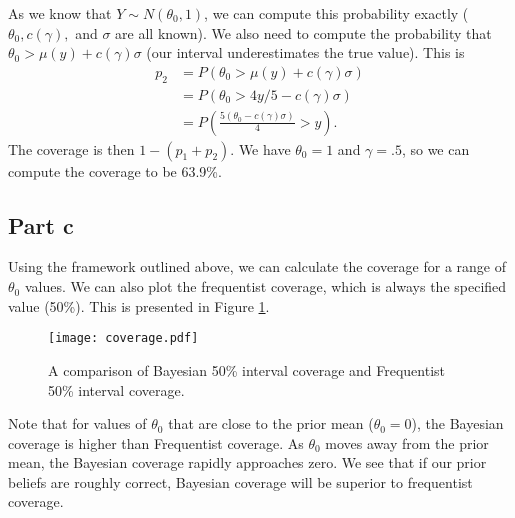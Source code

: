 \documentclass[a4paper,10pt]{article}
\begin{document}
As we know that $Y \sim N(\theta_{0},1)$, we can compute this probability exactly ($\theta_{0}, c(\gamma),$ and $\sigma$ are all known).  We also need to compute the probability that $\theta_{0} > \mu(y) + c(\gamma)\sigma$ (our interval underestimates the true value).  This is
\begin{align*}
p_{2} &= P(\theta_{0}>\mu(y)+c(\gamma)\sigma) \\
&= P(\theta_{0}>4y/5-c(\gamma)\sigma) \\
&= P\left(\frac{5(\theta_{0}-c(\gamma)\sigma)}{4} > y\right).
\end{align*}
The coverage is then $1 - (p_{1}+p_{2})$.  We have $\theta_{0}=1$ and $\gamma = .5$, so we can compute the coverage to be 63.9\%.  

\subsection{Part c}
Using the framework outlined above, we can calculate the coverage for a range of $\theta_{0}$ values.  We can also plot the frequentist coverage, which is always the specified value (50\%).  This is presented in Figure \ref{cover}.  
\begin{figure}
\centering
\texttt{[image: coverage.pdf]}
\caption{\label{cover} A comparison of Bayesian 50\% interval coverage and Frequentist 50\% interval coverage.}
\end{figure}
Note that for values of $\theta_{0}$ that are close to the prior mean ($\theta_{0}=0$), the Bayesian coverage is higher than Frequentist coverage.  As $\theta_{0}$ moves away from the prior mean, the Bayesian coverage rapidly approaches zero.  We see that if our prior beliefs are roughly correct, Bayesian coverage will be superior to frequentist coverage.  
\end{document}
